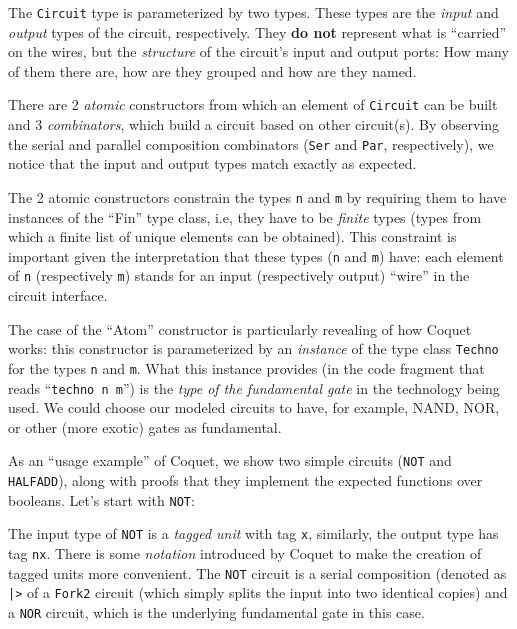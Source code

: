 \documentclass[a4paper]{article}
\begin{document}
                The \texttt{Circuit} type is parameterized by two types. These types are the
                \emph{input} and \emph{output} types of the circuit, respectively. They \textbf{do
                    not} represent what is ``carried'' on the wires, but the \emph{structure} of the
                circuit's input and output ports: How many of them there are, how are they grouped
                and how are they named.

                There are 2 \emph{atomic} constructors from which an element of \texttt{Circuit} can
                be built and 3 \emph{combinators}, which build a circuit based on other circuit(s).
                By observing the serial and parallel composition combinators (\texttt{Ser} and
                \texttt{Par}, respectively), we notice that the input and output types match exactly
                as expected.

                The 2 atomic constructors constrain the types \texttt{n} and \texttt{m} by requiring
                them to have instances of the ``Fin'' type class, i.e, they have to be \emph{finite}
                types (types from which a finite list of unique elements can be obtained). This
                constraint is important given the interpretation that these types (\texttt{n} and
                \texttt{m}) have: each element of \texttt{n} (respectively \texttt{m}) stands for an
                input (respectively output) ``wire'' in the circuit interface.

                The case of the ``Atom'' constructor is particularly revealing of how Coquet works:
                this constructor is parameterized by an \emph{instance} of the type class
                \texttt{Techno} for the types \texttt{n} and \texttt{m}. What this instance provides
                (in the code fragment that reads ``\texttt{techno n m}'') is the \emph{type of the
                    fundamental gate} in the technology being used. We could choose our modeled
                circuits to have, for example, NAND, NOR, or other (more exotic) gates as
                fundamental.

                As an ``usage example'' of Coquet, we show two simple circuits (\texttt{NOT} and
                \texttt{HALFADD}), along with proofs that they implement the expected functions over
                booleans. Let's start with \texttt{NOT}:


                The input type of \texttt{NOT} is a \emph{tagged unit} with tag \texttt{x},
                similarly, the output type has tag \texttt{nx}. There is some \emph{notation}
                introduced by Coquet to make the creation of tagged units more convenient. The
                \texttt{NOT} circuit is a serial composition (denoted as \texttt{|>} of a
                \texttt{Fork2} circuit (which simply splits the input into two identical copies) and
                a \texttt{NOR} circuit, which is the underlying fundamental gate in this case.
\end{document}
